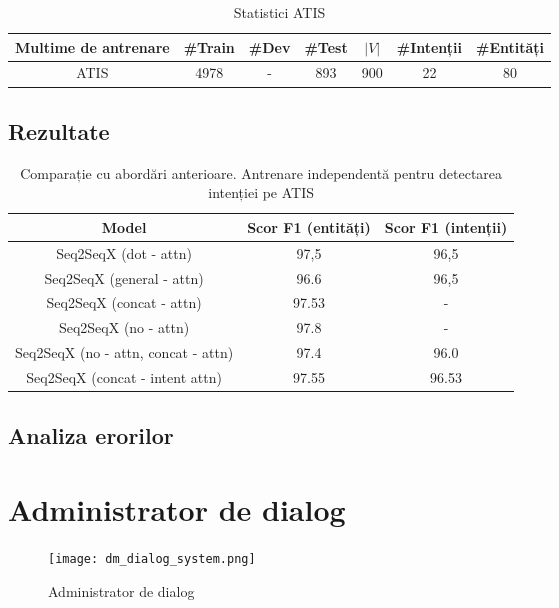 \begin{table}
	\centering
	\caption{Statistici ATIS}
	\label{atis_stats}
	\begin{adjustbox}{max width=\textwidth}
		\begin{tabular}{ |c|c|c|c|c|c|c| } 
			\hline
			\textbf{Multime de antrenare} & \#Train & \#Dev & \#Test & $|V|$ & \#Intenții & \#Entități \\ 
			\hline
			ATIS & 4978 & - & 893 & 900 & 22 & 80 \\
			\hline
		\end{tabular}
	\end{adjustbox}
\end{table}




\subsection{Rezultate}
\begin{center}

	\begin{table}
		\caption{Comparație cu abordări anterioare. Antrenare independentă pentru detectarea intenției pe ATIS}
		\label{atis_stats}
		\begin{tabular}{ c c c } 
			\hline
			\textbf{Model} 		 & \textbf{Scor F1 (entități)} & \textbf{Scor F1 (intenții)}\\
			\hline
			Seq2SeqX (dot - attn) & 97,5 & 96,5 \\
			\hline
			Seq2SeqX (general - attn) & 96.6 & 96,5 \\
			\hline
			Seq2SeqX (concat - attn) & 97.53 & - \\
			\hline
			Seq2SeqX (no - attn) & 97.8 & - \\
			\hline
			Seq2SeqX (no - attn, concat - attn) & 97.4 & 96.0 \\
			\hline
			Seq2SeqX (concat - intent attn) & 97.55 & 96.53 \\
			\hline
		\end{tabular}
	\end{table}
\end{center}

\subsection{Analiza erorilor}


\section{Administrator de dialog}
\begin{figure}[h]
	\centering
	\texttt{[image: dm\_dialog\_system.png]}
	\caption{Administrator de dialog}
	\label{fig:ds_proc}
\end{figure}

